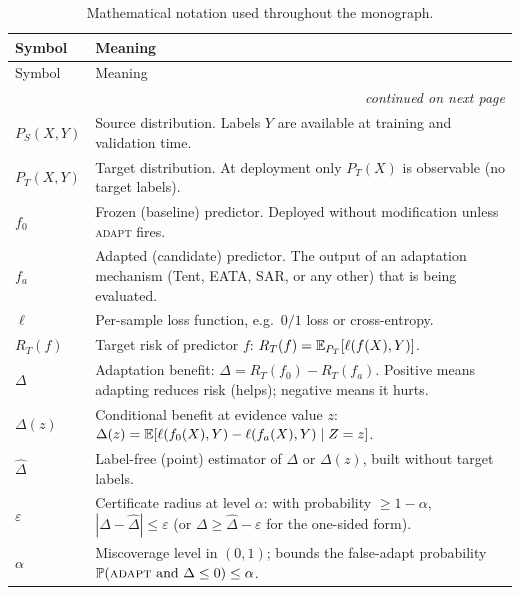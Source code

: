 \begin{longtable}{lp{11cm}}
\caption{Mathematical notation used throughout the monograph.}
\label{tab:notation}\\
\toprule
Symbol & Meaning \\
\midrule
\endfirsthead
\toprule
Symbol & Meaning \\
\midrule
\endhead
\midrule
\multicolumn{2}{r}{\textit{continued on next page}}\\
\endfoot
\bottomrule
\endlastfoot

$P_S(X,Y)$ &
  Source distribution.  Labels $Y$ are available at training and validation
  time. \\

$P_T(X,Y)$ &
  Target distribution.  At deployment only $P_T(X)$ is observable (no target
  labels). \\

$f_0$ &
  Frozen (baseline) predictor.  Deployed without modification unless
  \textsc{adapt} fires. \\

$f_a$ &
  Adapted (candidate) predictor.  The output of an adaptation mechanism
  (Tent, EATA, SAR, or any other) that is being evaluated. \\

$\ell$ &
  Per-sample loss function, e.g.\ $0/1$ loss or cross-entropy. \\

$R_T(f)$ &
  Target risk of predictor $f$: $R_T(f) = \E_{P_T}[\ell(f(X),Y)]$. \\

$\Delta$ &
  Adaptation benefit: $\Delta = R_T(f_0) - R_T(f_a)$.  Positive means
  adapting reduces risk (helps); negative means it hurts. \\

$\Delta(z)$ &
  Conditional benefit at evidence value $z$: $\Delta(z) = \E[\ell(f_0(X),Y)
  - \ell(f_a(X),Y) \mid Z = z]$. \\

$\widehat\Delta$ &
  Label-free (point) estimator of $\Delta$ or $\Delta(z)$, built without
  target labels. \\

$\varepsilon$ &
  Certificate radius at level $\alpha$: with probability $\geq 1-\alpha$,
  $|\Delta - \widehat\Delta| \leq \varepsilon$ (or $\Delta \geq \widehat\Delta
  - \varepsilon$ for the one-sided form). \\

$\alpha$ &
  Miscoverage level in $(0,1)$; bounds the false-adapt probability
  $\Pr(\textsc{adapt}\ \text{and}\ \Delta \leq 0) \leq \alpha$. \\


\end{longtable}
